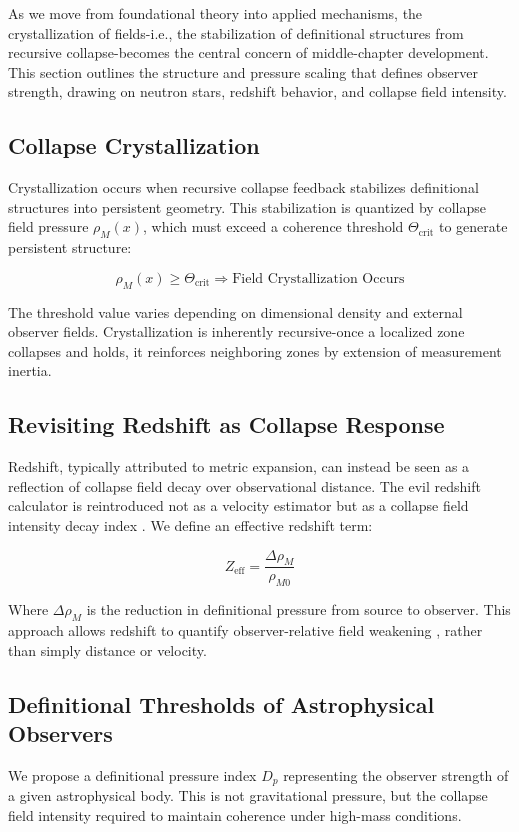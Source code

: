 As we move from foundational theory into applied mechanisms, the crystallization of fields-i.e., the stabilization of definitional structures from recursive collapse-becomes the central concern of middle-chapter development. This section outlines the structure and pressure scaling that defines observer strength, drawing on neutron stars, redshift behavior, and collapse field intensity.

\subsection{Collapse Crystallization}\cite{emergent_field_core, entanglement_structure, quantum_thermo_laws, thermalization_dynamics, blackhole_collapse_links}
Crystallization occurs when recursive collapse feedback stabilizes definitional structures into persistent geometry. This stabilization is quantized by collapse field pressure \( \rho_M(x) \), which must exceed a coherence threshold \( \Theta_{\text{crit}} \) to generate persistent structure:

\[ \rho_M(x) \geq \Theta_{\text{crit}} \Rightarrow \text{Field Crystallization Occurs} \]

The threshold value varies depending on dimensional density and external observer fields. Crystallization is inherently recursive-once a localized zone collapses and holds, it reinforces neighboring zones by extension of measurement inertia.

\subsection{Revisiting Redshift as Collapse Response}
Redshift, typically attributed to metric expansion, can instead be seen as a reflection of  collapse field decay  over observational distance. The evil redshift calculator is reintroduced not as a velocity estimator but as a  collapse field intensity decay index . We define an effective redshift term:

\[ Z_{\text{eff}} = \frac{\Delta \rho_M}{\rho_{M0}} \]

Where \( \Delta \rho_M \) is the reduction in definitional pressure from source to observer. This approach allows redshift to quantify  observer-relative field weakening , rather than simply distance or velocity.

\subsection{Definitional Thresholds of Astrophysical Observers}\cite{emergent_field_core, entanglement_structure, quantum_thermo_laws, thermalization_dynamics, blackhole_collapse_links}
We propose a definitional pressure index \( D_p \) representing the observer strength of a given astrophysical body. This is not gravitational pressure, but the  collapse field intensity required to maintain coherence  under high-mass conditions.

